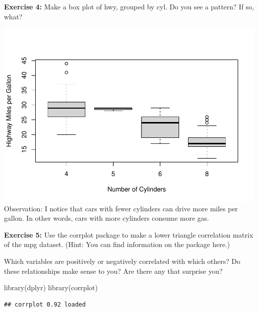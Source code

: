 \documentclass[
]{article}
\newenvironment{Shaded}{\begin{snugshade}}{\end{snugshade}}
\newcommand{\AttributeTok}[1]{\textcolor[rgb]{0.77,0.63,0.00}{#1}}
\newcommand{\FunctionTok}[1]{\textcolor[rgb]{0.00,0.00,0.00}{#1}}
\newcommand{\NormalTok}[1]{#1}
\newcommand{\SpecialCharTok}[1]{\textcolor[rgb]{0.00,0.00,0.00}{#1}}
\newcommand{\StringTok}[1]{\textcolor[rgb]{0.31,0.60,0.02}{#1}}
\begin{document}
\textbf{Exercise 4:} Make a box plot of hwy, grouped by cyl. Do you see
a pattern? If so, what?

\begin{Shaded}
\end{Shaded}

\includegraphics{PSTAT131-HW1_files/figure-latex/unnamed-chunk-4-1.pdf}
Observation: I notice that cars with fewer cylinders can drive more
miles per gallon. In other words, cars with more cylinders consume more
gas.

\textbf{Exercise 5:} Use the corrplot package to make a lower triangle
correlation matrix of the mpg dataset. (Hint: You can find information
on the package here.)

Which variables are positively or negatively correlated with which
others? Do these relationships make sense to you? Are there any that
surprise you?

\begin{Shaded}
\begin{Highlighting}[]
\FunctionTok{library}\NormalTok{(dplyr)}
\FunctionTok{library}\NormalTok{(corrplot)}
\end{Highlighting}
\end{Shaded}

\begin{verbatim}
## corrplot 0.92 loaded
\end{verbatim}
\end{document}
